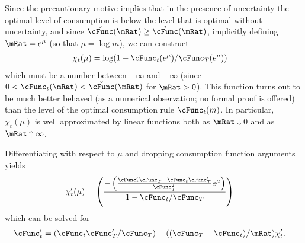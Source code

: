 \documentclass[\econtexRoot/BufferStockTheory.tex]{subfiles}
\begin{document}
Since the precautionary motive implies that in the presence of
uncertainty the optimal level of consumption is below the level that is
optimal without uncertainty, and since $\breve{\cFunc}(\mRat) \geq \mathring{\cFunc}(\mRat)$,
implicitly defining $\mRat = e^{\mu}$ (so that $\mu = \log m$), we can construct
\begin{equation}\begin{gathered}\begin{aligned}
 \chi_{t}(\mu)  & = \log (1-\cFunc_{t}(e^{\mu})/\cFunc_{T}(e^{\mu}))  \label{eq:ChiDef}
\end{aligned}\end{gathered}\end{equation}
which must be a number between $-\infty$ and $+\infty$ (since $0 < \cFunc_{t}(\mRat) < \breve{\cFunc}(\mRat)$ for $\mRat > 0$).  This function turns out to be much better behaved (as
a numerical observation; no formal proof is offered) than the level of the optimal consumption rule $\cFunc_{t}(m)$.  In particular, $\chi_{t}(\mu)$ is well approximated by linear functions both as $\mRat \downarrow 0$ and as $\mRat \uparrow \infty$.

Differentiating with respect to $\mu$ and dropping consumption function arguments
yields
\begin{equation}\begin{gathered}\begin{aligned}
 \chi^{\prime}_{t}(\mu)  & = \left(\frac{-\left(\frac{\cFunc^{\prime}_{t}\cFunc_{T}-\cFunc_{t}\cFunc_{T}^{\prime}}{\cFunc_{T}^{2}}e^{\mu}\right)}{1-\cFunc_{t}/\cFunc_{T}}\right) \label{eq:ChiPDef}
\end{aligned}\end{gathered}\end{equation}
which can be solved for
\begin{equation}\begin{gathered}\begin{aligned}
 \cFunc^{\prime}_{t}  & = (\cFunc_{t}\cFunc_{T}^{\prime}/\cFunc_{T})-((\cFunc_{T}-\cFunc_{t})/\mRat)\chi^{\prime}_{t} \label{eq:cFuncPFromChi}.
\end{aligned}\end{gathered}\end{equation}
\end{document}
